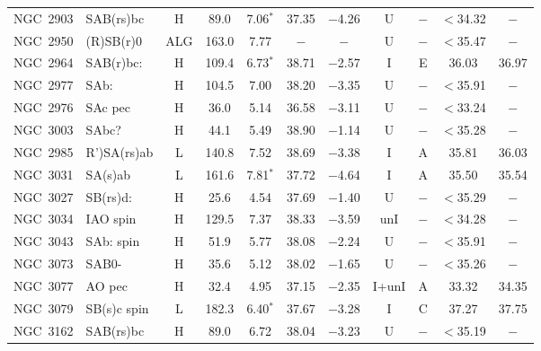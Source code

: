 \begin{center}
\begin{longtable}{lC{2.5cm}ccccccccc}
NGC~2903 & SAB(rs)bc     & H               & 89.0    & 7.06$^{*}$       & 37.35    & $-$4.26   &     U   &$-$       & $<$34.32  &   $-$       \\
NGC~2950 & (R)SB(r)0       & ALG             & 163.0   & 7.77             & $-$      & $-$     &    U   &$-$       & $<$35.47 & $-$       \\
NGC~2964 & SAB(r)bc:      & H               & 109.4 & 6.73$^{*}$       & 38.71    & $-$2.57   &    I   & E        &  36.03   & 36.97          \\
NGC~2977 & SAb:             & H               & 104.5 & 7.00             & 38.20    & $-$3.35 &   U   &$-$       & $<$35.91 & $-$       \\
NGC~2976 & SAc pec        & H               & 36.0    & 5.14             & 36.58    & $-$3.11  &     U   &$-$       & $<$33.24 & $-$       \\
NGC~3003 & SAbc?           & H               & 44.1  & 5.49             & 38.90    & $-$1.14  &    U   &$-$       & $<$35.28 & $-$          \\
NGC~2985  & R')SA(rs)ab   & L         & 140.8 & 7.52            & 38.69    & $-$3.38  &          I   & A        & 35.81    & 36.03     \\
NGC~3031 & SA(s)ab        & L      & 161.6 & 7.81$^{*}$       & 37.72    & $-$4.64  &            I   & A        & 35.50    & 35.54   \\
NGC~3027 & SB(rs)d:        & H               & 25.6  & 4.54             & 37.69    & $-$1.40   &   U   &$-$       & $<$35.29 & $-$       \\
NGC~3034 & IAO spin      & H               & 129.5 & 7.37             & 38.33   & $-$3.59  &       unI &$-$       & $<$34.28 & $-$       \\
NGC~3043 & SAb: spin     & H               & 51.9  & 5.77             & 38.08    & $-$2.24   &     U   &$-$       & $<$35.91 & $-$       \\
NGC~3073 & SAB0-           & H         & 35.6  & 5.12             & 38.02    & $-$1.65  &        U   &$-$       & $<$35.26 & $-$       \\
NGC~3077  & AO pec        & H               & 32.4  & 4.95             & 37.15    & $-$2.35 &      I+unI & A      & 33.32    & 34.35     \\
NGC~3079 & SB(s)c spin   & L         & 182.3 & 6.40$^{*}$        & 37.67    & $-$3.28  &           I   & C        & 37.27    & 37.75       \\
NGC~3162 & SAB(rs)bc     & H               & 89.0    & 6.72             & 38.04    & $-$3.23  &     U   &$-$       & $<$35.19 & $-$       \\

\end{longtable}
\end{center}
